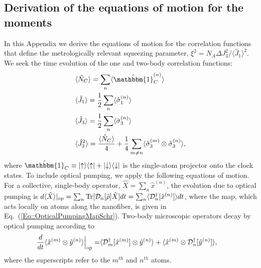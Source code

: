 \documentclass[preprint, aps,pra,onecolumn]{revtex4-1} %
\def\bra#1{\langle{#1}\rvert}%
\def\ket#1{\lvert{#1}\rangle}%
\newcommand{\erf}[1]{Eq.~(\ref{#1})}
\newcommand{\op}[2]{\ket{#1}\bra{#2}}
\newcommand{\expt}[1]{\langle{#1}\rangle}
\newcommand{\dg}{^\dagger}
\newcommand{\Tr}{\mbox{Tr}}
\begin{document}
\begin{appendix}
\section{Derivation of the equations of motion for the moments} \label{Appendix::OpticalPumping}	

In this Appendix we derive the equations of motion for the correlation functions that define the metrologically relevant squeezing parameter, $\xi^2 = N_A \Delta J_3^2/\expt{\hat{J}_1}^2$.  
We seek the time evolution of the one and two-body correlation functions:
\begin{subequations}
\begin{align}
&\expt{\hat{N}_C} = \sum_n \expt{\hat{\mathbbm{1}}^{(n)}_C} \\
&\expt{\hat{J}_1} = \frac{1}{2} \sum_n \expt{\hat{\sigma}_1^{(n)}} \\
&\expt{\hat{J}_3} = \frac{1}{2} \sum_n \expt{\hat{\sigma}_3^{(n)}} \\
&\expt{\hat{J}_3^2} = \frac{\expt{\hat{N}_C}}{4} +\frac{1}{4} \sum_{m \neq n} \expt{\hat{\sigma}_3^{(m)}\otimes \hat{\sigma}_3^{(n)}}, 
\end{align}
\end{subequations}
where $\hat{\mathbbm{1}}_C \equiv \op{\uparrow}{\uparrow} + \op{\downarrow}{\downarrow}$ is the single-atom projector onto the clock states. 
To include optical pumping, we apply the following equations of motion. For a collective, single-body operator, $\hat{X} = \sum_n \hat{x}^{(n)}$, the evolution due to optical pumping is $d\expt{ \hat{X}}|_{\rm op} = \sum_n \Tr [\mathcal{D}_n[\hat{\rho}]\hat{X} ]dt = \sum_n \expt{\mathcal{D}_n\dg[\hat{x}^{(n)}]} dt$, where the map, which acts locally on atoms along the nanofiber, is given in \erf{Eq::OpticalPumpingMapSchr}.  
Two-body microscopic operators decay by optical pumping according to \cite{baragiola_three-dimensional_2014}
	\begin{align} \label{Eq::TwoBodyDecay}
		\frac{d}{dt} \expt{ \hat{x}^{(m)} \otimes \hat{y}^{(n)} } \Big|_{\rm op}= &\expt{ \mathcal{D}_m\dg[ \hat{x}^{(m)}] \otimes \hat{y}^{(n)} } + \expt{ \hat{x}^{(m)}\otimes \mathcal{D}_n\dg[ \hat{y}^{(n)}] },
	\end{align}
where the superscripts refer to the $m^{th}$ and $n^{th}$ atoms. 


\end{appendix}
\end{document}
